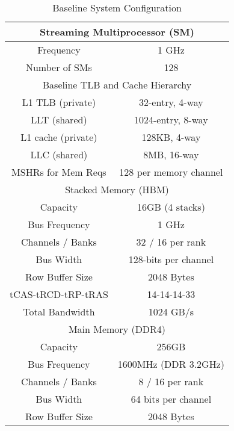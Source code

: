 \begin {table}[t]
\begin{center} 
\vspace{-0.1in}
\caption{Baseline System Configuration}
\vspace{-0. in}
\begin{tabular}{|c|c|}
\hline
     \multicolumn{2}{|c|}{Streaming Multiprocessor (SM)}               \\ \hline
     Frequency            &  1 GHz                                    \\ 
     Number of SMs        &  128                                        \\ \hline
     \multicolumn{2}{|c|}{Baseline TLB and Cache Hierarchy}            \\ \hline
     L1 TLB   (private)   &  32-entry, 4-way                \\ 
     LLT      (shared)    &  1024-entry, 8-way            \\ \hline
     L1 cache (private)   &  128KB,  4-way   \\ 
     LLC      (shared)    &  8MB, 16-way  \\
     MSHRs for Mem Reqs   &  128 per memory channel  \\ \hline
     \multicolumn{2}{|c|}{Stacked Memory (HBM)}            \\ \hline
     Capacity             &  16GB (4 stacks)          \\
     Bus Frequency        &  1 GHz     \\ 
     Channels / Banks    &  32  / 16 per rank        \\
     Bus Width            &  128-bits per channel    \\ 
     Row Buffer Size      &  2048 Bytes              \\
     \small{tCAS-tRCD-tRP-tRAS}   &  14-14-14-33     \\ 
     Total Bandwidth      &  1024 GB/s              \\ \hline
     \multicolumn{2}{|c|}{Main Memory (DDR4)}               \\ \hline
     Capacity             &  256GB                   \\
     Bus Frequency        &  1600MHz (DDR 3.2GHz)    \\ 
     Channels / Banks    &  8  / 16 per rank        \\
     Bus Width            &  64 bits per channel     \\ 
     Row Buffer Size      &  2048 Bytes              \\

\end{tabular}
\end{center}
\end{table}
